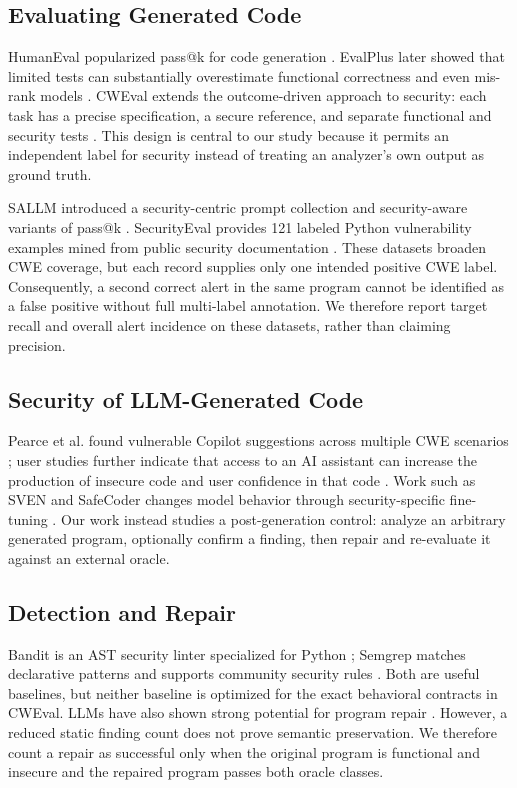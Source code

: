 \documentclass[sigconf,nonacm]{acmart}
\begin{document}
\subsection{Evaluating Generated Code}

HumanEval popularized pass@k for code generation \cite{chen2021codex}. EvalPlus
later showed that limited tests can substantially overestimate functional
correctness and even mis-rank models \cite{liu2023evalplus}. CWEval extends the
outcome-driven approach to security: each task has a precise specification, a
secure reference, and separate functional and security tests
\cite{peng2025cweval}. This design is central to our study because it permits an
independent label for security instead of treating an analyzer's own output as
ground truth.

SALLM introduced a security-centric prompt collection and security-aware
variants of pass@k \cite{siddiq2024sallm}. SecurityEval provides 121 labeled
Python vulnerability examples mined from public security documentation
\cite{siddiq2022securityeval}. These datasets broaden CWE coverage, but each
record supplies only one intended positive CWE label. Consequently, a second
correct alert in the same program cannot be identified as a false positive
without full multi-label annotation. We therefore report target recall and
overall alert incidence on these datasets, rather than claiming precision.

\subsection{Security of LLM-Generated Code}

Pearce et al. found vulnerable Copilot suggestions across multiple CWE
scenarios \cite{pearce2022asleep}; user studies further indicate that access to
an AI assistant can increase the production of insecure code and user
confidence in that code \cite{perry2022users}. Work such as SVEN and SafeCoder
changes model behavior through security-specific fine-tuning
\cite{he2023sven,he2024safecoder}. Our work instead studies a post-generation
control: analyze an arbitrary generated program, optionally confirm a finding,
then repair and re-evaluate it against an external oracle.

\subsection{Detection and Repair}

Bandit is an AST security linter specialized for Python \cite{bandit}; Semgrep
matches declarative patterns and supports community security rules
\cite{semgrep}. Both are useful baselines, but neither baseline is optimized for
the exact behavioral contracts in CWEval. LLMs have also shown strong potential
for program repair \cite{xia2023repair}. However, a reduced static finding count
does not prove semantic preservation. We therefore count a repair as successful
only when the original program is functional and insecure and the repaired
program passes both oracle classes.
\end{document}
